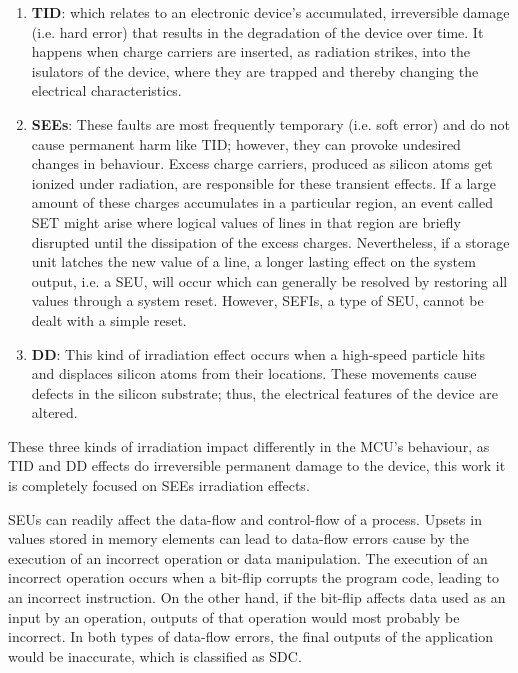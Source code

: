 \documentclass[10pt, a4paper]{report}
\begin{document}
\begin{enumerate}

    \item \textbf{\acrfull{TID}}: which relates to an electronic device's
        accumulated, irreversible damage (i.e. hard error) that results in the
        degradation of the device over time. It happens when charge carriers
        are inserted, as radiation strikes, into the isulators of the device,
        where they are trapped and thereby changing the electrical 
        characteristics.
    \item \textbf{\acrfull{SEEs}}: These faults are most frequently temporary
        (i.e. soft error) and do not cause permanent harm like \acrshort{TID};
        however, they can provoke undesired changes in behaviour. Excess charge
        carriers, produced as silicon atoms get ionized under radiation, are
        responsible for these transient effects. If a large amount of these
        charges accumulates in a particular region, an event called 
        \acrfull{SET} might arise where logical values of lines in that region
        are briefly disrupted until the dissipation of the excess charges.
        Nevertheless, if a storage unit latches the new value of a line, a
        longer lasting effect on the system output, i.e. a \acrfull{SEU}, will
        occur which can generally be resolved by restoring all values through a
        system reset. However, \acrfull{SEFIs}, a type of \acrshort{SEU}, cannot
        be dealt with a simple reset.
    \item \textbf{\acrfull{DD}}: This kind of irradiation effect occurs when a
        high-speed particle hits and displaces silicon atoms from their
        locations. These movements cause defects in the silicon substrate; thus,
        the electrical features of the device are altered.
\end{enumerate}

These three kinds of irradiation impact differently in the \acrshort{MCU}'s
behaviour, as \acrshort{TID} and \acrshort{DD} effects do irreversible permanent 
damage to the device, this work it is completely focused on \acrshort{SEEs} 
irradiation effects.

\acrshort{SEU}s can readily affect the data-flow and control-flow of a
process. Upsets in values stored in memory elements can lead to data-flow errors 
cause by the execution of an incorrect operation or data manipulation. The
execution of an incorrect operation occurs when a bit-flip corrupts the program
code, leading to an incorrect instruction. On the other hand, if the bit-flip
affects data used as an input by an operation, outputs of that operation would
most probably be incorrect. In both types of data-flow errors, the final outputs
of the application would be inaccurate, which is classified as \acrshort{SDC}.
\end{document}
